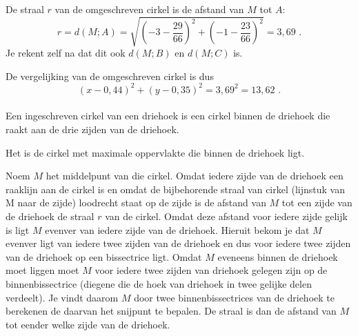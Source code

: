 \begin{voorbeeld}
De straal $r$ van de omgeschreven cirkel is de afstand van $M$ tot $A$:
\[
r=d(M;A)=\sqrt {\left(  -3-\frac {29}{66} \right)^2+\left( -1-\frac {23}{66} \right)^2}=3,69 \text { .}
\]
Je rekent zelf na dat dit ook $d(M;B)$ en $d(M;C)$ is.

De vergelijking van de omgeschreven cirkel is dus
\[
(x-0,44)^2+(y-0,35)^2=3,69^2=13,62 \text { .}
\]\\

Een ingeschreven cirkel van een driehoek is een cirkel binnen de driehoek die raakt aan de drie zijden van de driehoek.


Het is de cirkel met maximale oppervlakte die binnen de driehoek ligt.

Noem $M$ het middelpunt van die cirkel.
Omdat iedere zijde van de driehoek een raaklijn aan de cirkel is en omdat de bijbehorende straal van cirkel (lijnstuk van M naar de zijde) loodrecht staat op de zijde is de afstand van $M$ tot een zijde van de driehoek de straal $r$ van de cirkel.
Omdat deze afstand voor iedere zijde gelijk is ligt $M$ evenver van iedere zijde van de driehoek.
Hieruit bekom je dat $M$ evenver ligt van iedere twee zijden van de driehoek en dus voor iedere twee zijden van de driehoek op een bissectrice ligt.
Omdat $M$ eveneens binnen de driehoek moet liggen moet $M$ voor iedere twee zijden van driehoek gelegen zijn op de binnenbissectrice (diegene die de hoek van driehoek in twee gelijke delen verdeelt).
Je vindt daarom $M$ door twee binnenbissectrices van de driehoek te berekenen de daarvan het snijpunt te bepalen.
De straal is dan de afstand van $M$ tot eender welke zijde van de driehoek.\\

\end{voorbeeld}

